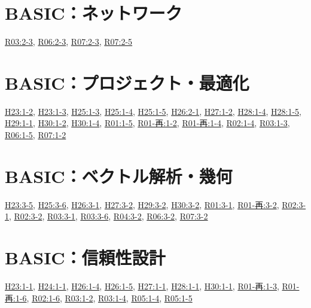 \section{BASIC：ネットワーク}
\hyperref[q:r03-reg-basic-2-3]{R03:2-3}, \hyperref[q:r06-reg-basic-2-3]{R06:2-3}, \hyperref[q:r07-reg-basic-2-3]{R07:2-3}, \hyperref[q:r07-reg-basic-2-5]{R07:2-5}
\section{BASIC：プロジェクト・最適化}
\hyperref[q:h23-reg-basic-1-2]{H23:1-2}, \hyperref[q:h23-reg-basic-1-3]{H23:1-3}, \hyperref[q:h25-reg-basic-1-3]{H25:1-3}, \hyperref[q:h25-reg-basic-1-4]{H25:1-4}, \hyperref[q:h25-reg-basic-1-5]{H25:1-5}, \hyperref[q:h26-reg-basic-2-1]{H26:2-1}, \hyperref[q:h27-reg-basic-1-2]{H27:1-2}, \hyperref[q:h28-reg-basic-1-4]{H28:1-4}, \hyperref[q:h28-reg-basic-1-5]{H28:1-5}, \hyperref[q:h29-reg-basic-1-1]{H29:1-1}, \hyperref[q:h30-reg-basic-1-2]{H30:1-2}, \hyperref[q:h30-reg-basic-1-4]{H30:1-4}, \hyperref[q:r01-reg-basic-1-5]{R01:1-5}, \hyperref[q:r01-ret-basic-1-2]{R01-再:1-2}, \hyperref[q:r01-ret-basic-1-4]{R01-再:1-4}, \hyperref[q:r02-reg-basic-1-4]{R02:1-4}, \hyperref[q:r03-reg-basic-1-3]{R03:1-3}, \hyperref[q:r06-reg-basic-1-5]{R06:1-5}, \hyperref[q:r07-reg-basic-1-2]{R07:1-2}
\section{BASIC：ベクトル解析・幾何}
\hyperref[q:h23-reg-basic-3-5]{H23:3-5}, \hyperref[q:h25-reg-basic-3-6]{H25:3-6}, \hyperref[q:h26-reg-basic-3-1]{H26:3-1}, \hyperref[q:h27-reg-basic-3-2]{H27:3-2}, \hyperref[q:h29-reg-basic-3-2]{H29:3-2}, \hyperref[q:h30-reg-basic-3-2]{H30:3-2}, \hyperref[q:r01-reg-basic-3-1]{R01:3-1}, \hyperref[q:r01-ret-basic-3-2]{R01-再:3-2}, \hyperref[q:r02-reg-basic-3-1]{R02:3-1}, \hyperref[q:r02-reg-basic-3-2]{R02:3-2}, \hyperref[q:r03-reg-basic-3-1]{R03:3-1}, \hyperref[q:r03-reg-basic-3-6]{R03:3-6}, \hyperref[q:r04-reg-basic-3-2]{R04:3-2}, \hyperref[q:r06-reg-basic-3-2]{R06:3-2}, \hyperref[q:r07-reg-basic-3-2]{R07:3-2}
\section{BASIC：信頼性設計}
\hyperref[q:h23-reg-basic-1-1]{H23:1-1}, \hyperref[q:h24-reg-basic-1-1]{H24:1-1}, \hyperref[q:h26-reg-basic-1-4]{H26:1-4}, \hyperref[q:h26-reg-basic-1-5]{H26:1-5}, \hyperref[q:h27-reg-basic-1-1]{H27:1-1}, \hyperref[q:h28-reg-basic-1-1]{H28:1-1}, \hyperref[q:h30-reg-basic-1-1]{H30:1-1}, \hyperref[q:r01-ret-basic-1-3]{R01-再:1-3}, \hyperref[q:r01-ret-basic-1-6]{R01-再:1-6}, \hyperref[q:r02-reg-basic-1-6]{R02:1-6}, \hyperref[q:r03-reg-basic-1-2]{R03:1-2}, \hyperref[q:r03-reg-basic-1-4]{R03:1-4}, \hyperref[q:r05-reg-basic-1-4]{R05:1-4}, \hyperref[q:r05-reg-basic-1-5]{R05:1-5}
